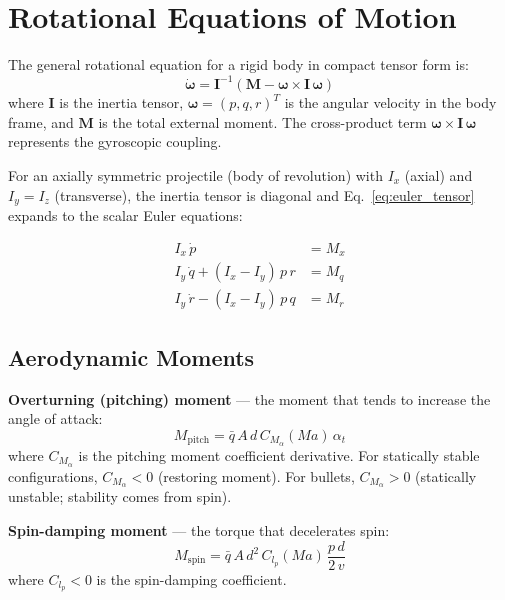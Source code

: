 \documentclass[11pt,twoside,openright]{report}
\newcommand{\Mach}{\mathit{Ma}}
\begin{document}
\section{Rotational Equations of Motion}

The general rotational equation for a rigid body in compact tensor form is:
\begin{equation}
  \boxed{\dot{\bm{\omega}} = \bm{I}^{-1}\!\left(\bm{M} - \bm{\omega} \times \bm{I}\,\bm{\omega}\right)}
  \label{eq:euler_tensor}
\end{equation}
where $\bm{I}$ is the inertia tensor, $\bm{\omega} = (p, q, r)^T$ is the angular velocity in the body frame, and $\bm{M}$ is the total external moment. The cross-product term $\bm{\omega} \times \bm{I}\,\bm{\omega}$ represents the gyroscopic coupling.

For an axially symmetric projectile (body of revolution) with $I_x$ (axial) and $I_y = I_z$ (transverse), the inertia tensor is diagonal and Eq.~\eqref{eq:euler_tensor} expands to the scalar Euler equations:

\begin{align}
  I_x\,\dot{p} &= M_x \label{eq:euler_p}\\
  I_y\,\dot{q} + (I_x - I_y)\,p\,r &= M_q \label{eq:euler_q}\\
  I_y\,\dot{r} - (I_x - I_y)\,p\,q &= M_r \label{eq:euler_r}
\end{align}

\subsection{Aerodynamic Moments}

\textbf{Overturning (pitching) moment} --- the moment that tends to increase the angle of attack:
\begin{equation}
  M_{\mathrm{pitch}} = \bar{q}\,A\,d\,C_{M_\alpha}(\Mach)\,\alpha_t
  \label{eq:overturning_moment}
\end{equation}
where $C_{M_\alpha}$ is the pitching moment coefficient derivative. For statically stable configurations, $C_{M_\alpha} < 0$ (restoring moment). For bullets, $C_{M_\alpha} > 0$ (statically unstable; stability comes from spin).

\textbf{Spin-damping moment} --- the torque that decelerates spin:
\begin{equation}
  M_{\mathrm{spin}} = \bar{q}\,A\,d^2\,C_{l_p}(\Mach)\,\frac{p\,d}{2\,v}
  \label{eq:spin_damping}
\end{equation}
where $C_{l_p} < 0$ is the spin-damping coefficient.
\end{document}
